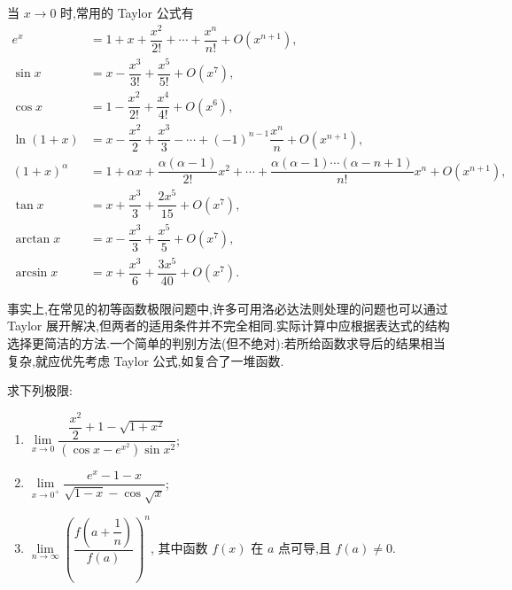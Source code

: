 当 $x\to0$ 时,常用的 Taylor 公式有
\[
    \begin{aligned}
        e^x
         & =1+x+\dfrac{x^2}{2!}+\cdots+\dfrac{x^n}{n!}+O(x^{n+1}), \\
        \sin x
         & =x-\dfrac{x^3}{3!}+\dfrac{x^5}{5!}+O(x^7),              \\
        \cos x
         & =1-\dfrac{x^2}{2!}+\dfrac{x^4}{4!}+O(x^6),              \\
        \ln(1+x)
         & =x-\dfrac{x^2}{2}+\dfrac{x^3}{3}-\cdots
        +(-1)^{n-1}\dfrac{x^n}{n}+O(x^{n+1}),                      \\
        (1+x)^\alpha
         & =1+\alpha x+\dfrac{\alpha(\alpha-1)}{2!}x^2+\cdots
        +\dfrac{\alpha(\alpha-1)\cdots(\alpha-n+1)}{n!}x^n
        +O(x^{n+1}),                                               \\
        \tan x
         & =x+\dfrac{x^3}{3}+\dfrac{2x^5}{15}+O(x^7),              \\
        \arctan x
         & =x-\dfrac{x^3}{3}+\dfrac{x^5}{5}+O(x^7),                \\
        \arcsin x
         & =x+\dfrac{x^3}{6}+\dfrac{3x^5}{40}+O(x^7).
    \end{aligned}
\]

事实上,在常见的初等函数极限问题中,许多可用洛必达法则处理的问题也可以通过 Taylor 展开解决,但两者的适用条件并不完全相同.实际计算中应根据表达式的结构选择更简洁的方法.一个简单的判别方法(但不绝对):若所给函数求导后的结果相当复杂,就应优先考虑 Taylor 公式,如复合了一堆函数.

\begin{example}
    求下列极限:
    \begin{enumerate}
        \item $\displaystyle
                  \lim\limits_{x\to0}
                  \dfrac{\dfrac{x^2}{2}+1-\sqrt{1+x^2}}
                  {(\cos x-e^{x^2})\sin x^2}$;
        \item $\displaystyle
                  \lim\limits_{x\to0^+}
                  \dfrac{e^x-1-x}{\sqrt{1-x}-\cos\sqrt{x}}$;
        \item $\displaystyle
                  \lim\limits_{n\to\infty}
                  \left(\dfrac{f\left(a+\dfrac{1}{n}\right)}{f(a)}\right)^n$,
              其中函数 $f(x)$ 在 $a$ 点可导,且 $f(a)\neq0$.
    \end{enumerate}
\end{example}
\exampleblank

